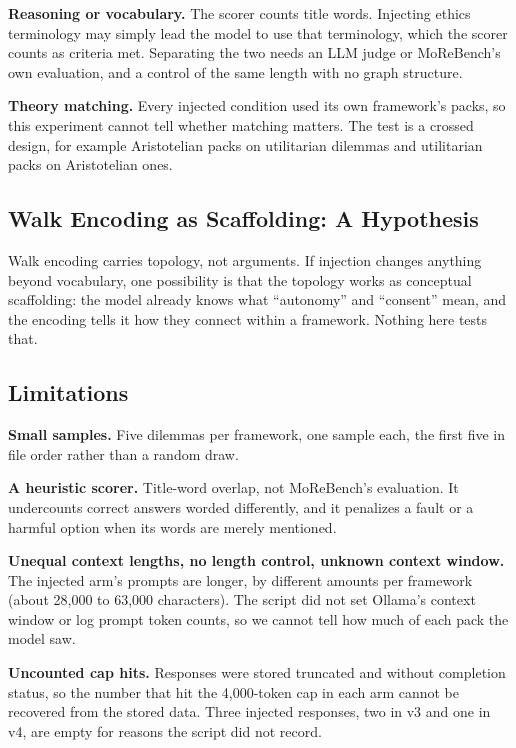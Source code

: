 \documentclass[11pt,a4paper]{article}
\begin{document}
\textbf{Reasoning or vocabulary.} The scorer counts title words. Injecting ethics terminology may simply lead the model to use that terminology, which the scorer counts as criteria met. Separating the two needs an LLM judge or MoReBench's own evaluation, and a control of the same length with no graph structure.

\textbf{Theory matching.} Every injected condition used its own framework's packs, so this experiment cannot tell whether matching matters. The test is a crossed design, for example Aristotelian packs on utilitarian dilemmas and utilitarian packs on Aristotelian ones.

\subsection{Walk Encoding as Scaffolding: A Hypothesis}

Walk encoding carries topology, not arguments. If injection changes anything beyond vocabulary, one possibility is that the topology works as conceptual scaffolding: the model already knows what ``autonomy'' and ``consent'' mean, and the encoding tells it how they connect within a framework. Nothing here tests that.

\subsection{Limitations}
\label{sec:limits}

\textbf{Small samples.} Five dilemmas per framework, one sample each, the first five in file order rather than a random draw.

\textbf{A heuristic scorer.} Title-word overlap, not MoReBench's evaluation. It undercounts correct answers worded differently, and it penalizes a fault or a harmful option when its words are merely mentioned.

\textbf{Unequal context lengths, no length control, unknown context window.} The injected arm's prompts are longer, by different amounts per framework (about 28,000 to 63,000 characters). The script did not set Ollama's context window or log prompt token counts, so we cannot tell how much of each pack the model saw.

\textbf{Uncounted cap hits.} Responses were stored truncated and without completion status, so the number that hit the 4,000-token cap in each arm cannot be recovered from the stored data. Three injected responses, two in v3 and one in v4, are empty for reasons the script did not record.
\end{document}
